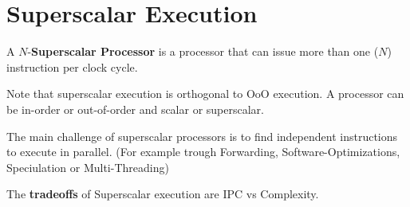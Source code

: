 \section{Superscalar Execution}

\begin{definition}
    A $N$-\textbf{Superscalar Processor} is a processor that can issue more than one ($N$) instruction per clock cycle.
\end{definition}

\begin{remark}
    Note that superscalar execution is orthogonal to OoO execution. A processor can be in-order or out-of-order and scalar or superscalar.
\end{remark}

\begin{important}
    The main challenge of superscalar processors is to find independent instructions to execute in parallel. (For example trough Forwarding, Software-Optimizations, Speciulation or Multi-Threading)
\end{important}

\begin{remark}
    The \textbf{tradeoffs} of Superscalar execution are IPC vs Complexity.
\end{remark}
